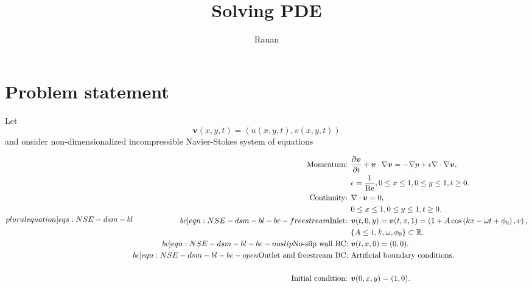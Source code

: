 \documentclass{article}
\title{Solving PDE}
\author{Rauan}
\numberwithin{equation}{section}
\begin{document}
\maketitle

\begin{abstract}
\end{abstract}

\tableofcontents

\newpage 

\section{Problem statement}\label{sec:statement}

Let $$\boldsymbol{v}(x,y,t)=\left(u\left(x,y,t\right),v\left(x,y,t\right)\right)$$
 and onsider non-dimensionalized incompressible Navier-Stokes system of equations

\begin{subequations}
\label[pluralequation]{eqs:NSE-dsm-bl}
\begin{align}
\label{eqn:momentum}
\text{Momentum: }	&\frac{\partial \boldsymbol{v}}{\partial t} + \boldsymbol{v} \cdot \nabla \boldsymbol{v} = -\nabla p + \epsilon \nabla \cdot \nabla \boldsymbol{v}, \\ 
					&\epsilon = \frac{1}{\operatorname{Re}},0\leq x \leq 1, 0\leq y \leq 1, t\geq0.\notag\\
\label{eqn:continuity-dsm-bl}
\text{Continuity: }	& \nabla \cdot \boldsymbol{v} = 0, \\ 
					&0\leq x \leq 1, 0\leq y \leq 1, t\geq0. \notag\\
\label[bc]{eqn:NSE-dsm-bl-bc-freestream}
\text{Inlet: } 	& \boldsymbol{v}(t,0,y)=\boldsymbol{v}(t,x,1)=\left(1 + A\cos\left( kx -\omega t + \phi_0   \right),v\right),\\
									& \{A\leq 1,k,\omega, \phi_0\}\subset \mathbb{R}.\notag\\
\label[bc]{eqn:NSE-dsm-bl-bc-noslip}
\text{No-slip wall BC: } & \boldsymbol{v}(t,x,0)=(0,0). \\
\label[bc]{eqn:NSE-dsm-bl-bc-open}
\text{Outlet and freestream BC: } 	&\text{Artificial boundary conditions.} \\
					&\text{}\notag\\
\label{eqn:IC}
\text{Initial condition: } &\boldsymbol{v}(0,x,y)=(1,0).
\end{align}
\end{subequations}
\end{document}
